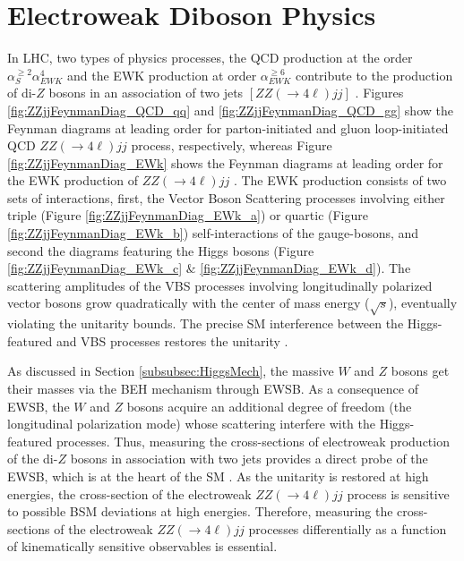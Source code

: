 \section{ Electroweak Diboson Physics } 
\label{sec:EWKPheno}

In LHC, two types of physics processes, the QCD production at the order $\alpha_{S}^{\geq 2} \alpha_{EWK}^{4}$ and the EWK production at order $\alpha_{EWK}^{\geq6}$ contribute to the production of di-$Z$ bosons in an association of two jets $[ ZZ( \rightarrow 4\ell) jj ]$ \cite{CMSRun2ZZjj}. Figures \ref{fig:ZZjjFeynmanDiag_QCD_qq} and \ref{fig:ZZjjFeynmanDiag_QCD_gg} show the Feynman diagrams at leading order for parton-initiated and gluon loop-initiated QCD $ZZ( \rightarrow 4\ell) jj$ process, respectively, whereas Figure \ref{fig:ZZjjFeynmanDiag_EWk} shows the Feynman diagrams at leading order for the EWK production of $ZZ( \rightarrow 4\ell) jj$ \cite{PowhegV2ZZjj}. The EWK production consists of two sets of interactions, first, the Vector Boson Scattering processes involving either triple (Figure \ref{fig:ZZjjFeynmanDiag_EWk_a}) or quartic (Figure \ref{fig:ZZjjFeynmanDiag_EWk_b}) self-interactions of the gauge-bosons, and second the diagrams featuring the Higgs bosons (Figure \ref{fig:ZZjjFeynmanDiag_EWk_c} $\&$ \ref{fig:ZZjjFeynmanDiag_EWk_d}). The scattering amplitudes of the VBS processes involving longitudinally polarized vector bosons grow quadratically with the center of mass energy ($\sqrt{s}$), eventually violating the unitarity bounds. The precise SM interference between the Higgs-featured and VBS processes restores the unitarity \cite{VBSWWWW}.

As discussed in Section \ref{subsubsec:HiggsMech}, the massive $W$ and $Z$ bosons get their masses via the BEH mechanism through EWSB. As a consequence of EWSB, the $W$ and $Z$ bosons acquire an additional degree of freedom (the longitudinal polarization mode) whose scattering interfere with the Higgs-featured processes. Thus, measuring the cross-sections of electroweak production of the di-$Z$ bosons in association with two jets provides a direct probe of the EWSB, which is at the heart of the SM \cite{CMSRun2ZZjj}. As the unitarity is restored at high energies, the cross-section of the electroweak $ZZ( \rightarrow 4\ell) jj$ process is sensitive to possible BSM deviations at high energies. Therefore, measuring the cross-sections of the electroweak $ZZ( \rightarrow 4\ell) jj$ processes differentially as a function of kinematically sensitive observables is essential. 

